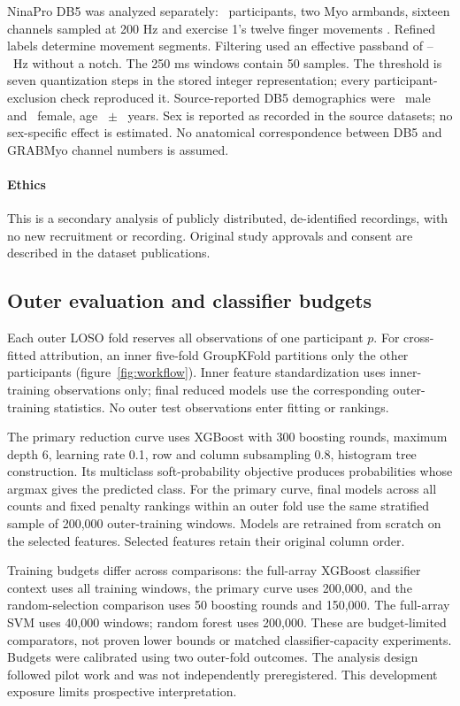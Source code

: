 NinaPro DB5 was analyzed separately: \DBFiveSubjects\ participants, two Myo armbands, sixteen channels sampled at 200 Hz and exercise 1's twelve finger movements \citep{pizzolato2017comparison}. Refined labels determine movement segments. Filtering used an effective passband of \RevDBFiveBandLow--\RevDBFiveBandHigh\ Hz without a notch. The 250 ms windows contain 50 samples. The threshold is seven quantization steps in the stored integer representation; every participant-exclusion check reproduced it. Source-reported DB5 demographics were \DBFiveMale\ male and \DBFiveFemale\ female, age \DBFiveAgeMean\ $\pm$ \DBFiveAgeSD\ years. Sex is reported as recorded in the source datasets; no sex-specific effect is estimated. No anatomical correspondence between DB5 and GRABMyo channel numbers is assumed.

\paragraph{Ethics} This is a secondary analysis of publicly distributed, de-identified recordings, with no new recruitment or recording. Original study approvals and consent are described in the dataset publications.

\subsection{Outer evaluation and classifier budgets}
Each outer LOSO fold reserves all observations of one participant $p$. For cross-fitted attribution, an inner five-fold GroupKFold partitions only the other participants (figure~\ref{fig:workflow}). Inner feature standardization uses inner-training observations only; final reduced models use the corresponding outer-training statistics. No outer test observations enter fitting or rankings.

The primary reduction curve uses XGBoost with 300 boosting rounds, maximum depth 6, learning rate 0.1, row and column subsampling 0.8, histogram tree construction. Its multiclass soft-probability objective produces probabilities whose argmax gives the predicted class. For the primary curve, final models across all counts and fixed penalty rankings within an outer fold use the same stratified sample of 200,000 outer-training windows. Models are retrained from scratch on the selected features. Selected features retain their original column order.

Training budgets differ across comparisons: the full-array XGBoost classifier context uses all training windows, the primary curve uses 200,000, and the random-selection comparison uses 50 boosting rounds and 150,000. The full-array SVM uses 40,000 windows; random forest uses 200,000. These are budget-limited comparators, not proven lower bounds or matched classifier-capacity experiments. Budgets were calibrated using two outer-fold outcomes. The analysis design followed pilot work and was not independently preregistered. This development exposure limits prospective interpretation.

